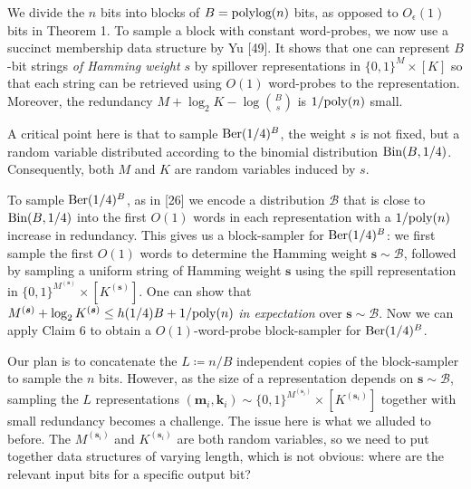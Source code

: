 We divide the $n$ bits into blocks of $B=\textnormal{polylog}(n)$ bits, as opposed to $O_{\epsilon}(1)$ bits in Theorem 1.
To sample a block with constant word-probes, we now use a succinct membership data structure by Yu [49].
It shows that one can represent $B$-bit strings \emph{of Hamming weight $s$} by spillover representations in $\{0,1\}^{M}\times[K]$ so that each string can be retrieved using $O(1)$ word-probes to the representation. Moreover, the redundancy $M+\log_{2}K-\log\binom{B}{s}$ is $1/\textnormal{poly}(n)$ small.\par




A critical point here is that to sample $\textnormal{Ber}(1/4)^{B}$, the weight $s$ is not fixed, but a random variable distributed according to the binomial distribution $\textnormal{Bin}(B,1/4)$. Consequently, both $M$ and $K$ are random variables induced by $s$.\par




To sample $\textnormal{Ber}(1/4)^{B}$, as in [26] we encode a distribution $\mathcal{B}$ that is close to $\textnormal{Bin}(B,1/4)$ into the first $O(1)$ words in each representation with a $1/\textnormal{poly}(n)$ increase in redundancy.
This gives us a block-sampler for $\textnormal{Ber}(1/4)^{B}$:
we first sample the first $O(1)$ words to determine the Hamming weight $\boldsymbol{s}\sim\mathcal{B}$, followed by sampling a uniform string of Hamming weight $\boldsymbol{s}$ using the spill representation in $\{0,1\}^{M^{(\boldsymbol{s})}}\times[K^{(\boldsymbol{s})}]$.
One can show that $M^{(\boldsymbol{s})}+\log_{2}K^{(\boldsymbol{s})}\leq h(1/4)B+1/\textnormal{poly}(n)$ \emph{in expectation} over $\boldsymbol{s}\sim\mathcal{B}$.
Now we can apply Claim 6 to obtain a $O(1)$-word-probe block-sampler for $\textnormal{Ber}(1/4)^{B}$.\par




Our plan is to concatenate the $L\coloneq n/B$ independent copies of the block-sampler to sample the $n$ bits.
However, as the size of a representation depends on $\boldsymbol{s}\sim\mathcal{B}$, sampling the $L$ representations $(\boldsymbol{m}_{i},\boldsymbol{k}_{i})\sim\{0,1\}^{M^{(\boldsymbol{s}_{i})}}\times[K^{(\boldsymbol{s}_{i})}]$ together with small redundancy becomes a challenge. The issue here is what we alluded to before. The $M^{(\boldsymbol{s}_{i})}$ and $K^{(\boldsymbol{s}_{i})}$ are both random variables, so we need to put together data structures of varying length, which is not obvious: where are the relevant input bits for a specific output bit?\par




